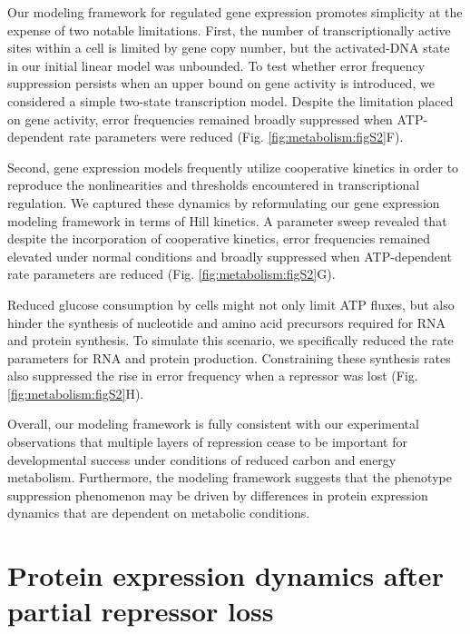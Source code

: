 Our modeling framework for regulated gene expression promotes simplicity at the expense of two notable limitations. First, the number of transcriptionally active sites within a cell is limited by gene copy number, but the activated-DNA state in our initial linear model was unbounded. To test whether error frequency suppression persists when an upper bound on gene activity is introduced, we considered a simple two-state transcription model. Despite the limitation placed on gene activity, error frequencies remained broadly suppressed when ATP-dependent rate parameters were reduced (Fig. \ref{fig:metabolism:figS2}F).

Second, gene expression models frequently utilize cooperative kinetics in order to reproduce the nonlinearities and thresholds encountered in transcriptional regulation. We captured these dynamics by reformulating our gene expression modeling framework in terms of Hill kinetics. A parameter sweep revealed that despite the incorporation of cooperative kinetics, error frequencies remained elevated under normal conditions and broadly suppressed when ATP-dependent rate parameters are reduced (Fig. \ref{fig:metabolism:figS2}G).

Reduced glucose consumption by cells might not only limit ATP fluxes, but also hinder the synthesis of nucleotide and amino acid precursors required for RNA and protein synthesis. To simulate this scenario, we specifically reduced the rate parameters for RNA and protein production. Constraining these synthesis rates also suppressed the rise in error frequency when a repressor was lost (Fig. \ref{fig:metabolism:figS2}H).

Overall, our modeling framework is fully consistent with our experimental observations that multiple layers of repression cease to be important for developmental success under conditions of reduced carbon and energy metabolism. Furthermore, the modeling framework suggests that the phenotype suppression phenomenon may be driven by differences in protein expression dynamics that are dependent on metabolic conditions.

\section{Protein expression dynamics after partial repressor loss}

